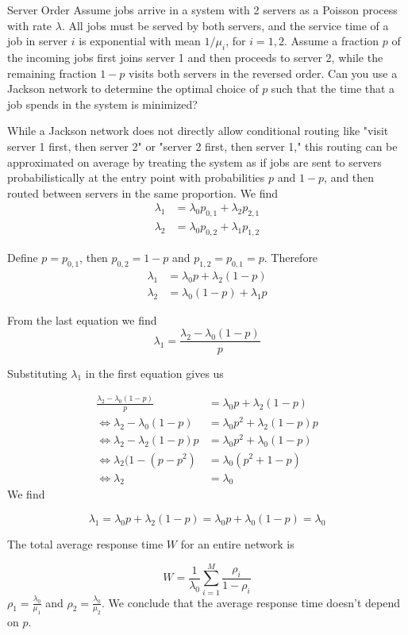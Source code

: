 \begin{problem}{Server Order}
Assume jobs arrive in a system with 2 servers as a Poisson process with rate \( \lambda \). All jobs must be served by both servers, and the service time of a job in server \( i \) is exponential with mean \( 1/\mu_i \), for \( i = 1, 2 \). Assume a fraction \( p \) of the incoming jobs first joins server 1 and then proceeds to server 2, while the remaining fraction \( 1 - p \) visits both servers in the reversed order. Can you use a Jackson network to determine the optimal choice of \( p \) such that the time that a job spends in the system is minimized?
\end{problem}

\begin{solution}
  While a Jackson network does not directly allow conditional routing like "visit server 1 first, then server 2" or "server 2 first, then server 1," this routing can be approximated on average by treating the system as if jobs are sent to servers probabilistically at the entry point with probabilities $p$ and $1-p$, and then routed between servers in the same proportion. We find
  \begin{align*}
    \lambda_1 &= \lambda_0p_{0,1} + \lambda_2p_{2,1} \\
    \lambda_2 &= \lambda_0p_{0,2} + \lambda_1p_{1,2}
  \end{align*}

  Define $p=p_{0,1}$, then $p_{0,2}=1-p$ and $p_{1,2} = p_{0,1} = p$. Therefore
  \begin{align*}
    \lambda_1 &= \lambda_0p + \lambda_2(1-p) \\
    \lambda_2 &= \lambda_0(1-p) + \lambda_1p
  \end{align*}

  From the last equation we find
  \[
    \lambda_1 = \frac{\lambda_2-\lambda_0(1-p)}{p}
  \]

  Substituting $\lambda_1$ in the first equation gives us

  \begin{align*}
    \frac{\lambda_2-\lambda_0(1-p)}{p} &= \lambda_0p + \lambda_2(1-p) \\
    \Leftrightarrow\lambda_2-\lambda_0(1-p) &= \lambda_0p^2 + \lambda_2(1-p)p \\
    \Leftrightarrow\lambda_2-\lambda_2(1-p)p &= \lambda_0p^2 + \lambda_0(1-p) \\
    \Leftrightarrow\lambda_2(1-(p-p^2) &= \lambda_0(p^2 + 1-p) \\
    \Leftrightarrow\lambda_2 &= \lambda_0
  \end{align*}
  We find

  \[
    \lambda_1 = \lambda_0p + \lambda_2(1-p) = \lambda_0p + \lambda_0(1-p) = \lambda_0
  \]

  The total average response time $W$ for an entire network is

  \[
    W = \frac{1}{\lambda_0}\sum_{i=1}^M\frac{\rho_i}{1-\rho_i}
  \]
  $\rho_1 = \frac{\lambda_0}{\mu_1}$ and $\rho_2 = \frac{\lambda_0}{\mu_2}$. We conclude that the average response time doesn't depend on $p$.
\end{solution}

